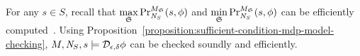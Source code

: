 For any $s \in S$, recall that $\max\limits_{\scheduler{S}}
\myPr{s}{M_{\scheduler{S}}}{\neighbor{S}}{\phi}$ and
$\min\limits_{\scheduler{S}}
\myPr{s}{M_{\scheduler{S}}}{\neighbor{S}}{\phi}$ can be efficiently 
computed~\cite{BK:08:PMC}. 
Using
Proposition~\ref{proposition:sufficient-condition-mdp-model-checking},
$M, \neighbor{S}, s \models \dpriv{\epsilon}{\delta} \phi$ can be
checked soundly and efficiently.

